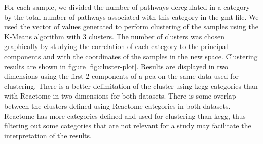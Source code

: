 For each sample, we divided the number of pathways deregulated in a category by the total number of pathways associated with this category in the \acrshort{gmt} file.
We used the vector of values generated to perform clustering of the samples using the K-Means algorithm with 3 clusters.
The number of clusters was chosen graphically by studying the correlation of each category to the principal components and with the coordinates of the samples in the new space.
Clustering results are shown in figure \ref*{fig:cluster-plot}.
Results are displayed in two dimensions using the first 2 components of a \acrshort{pca} on the same data used for clustering.
There is a better delimitation of the cluster using \acrshort{kegg} categories than with Reactome in two dimensions for both datasets.
There is some overlap between the clusters defined using Reactome categories in both datasets.
Reactome has more categories defined and used for clustering than \acrshort{kegg}, thus filtering out some categories that are not relevant for a study may facilitate the interpretation of the results.

